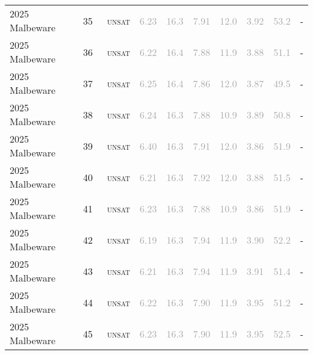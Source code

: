 \begin{center}
{\begin{longtable}{@{}llllllllll@{}}
2025 Malbeware & 35 & ~\textsc{unsat} & \textcolor{darkgray}{6.23} & \textcolor{darkgray}{16.3} & \textcolor{darkgray}{7.91} & \textcolor{darkgray}{12.0} & \textcolor{darkgray}{3.92} & \textcolor{darkgray}{53.2} & - \\
2025 Malbeware & 36 & ~\textsc{unsat} & \textcolor{darkgray}{6.22} & \textcolor{darkgray}{16.4} & \textcolor{darkgray}{7.88} & \textcolor{darkgray}{11.9} & \textcolor{darkgray}{3.88} & \textcolor{darkgray}{51.1} & - \\
2025 Malbeware & 37 & ~\textsc{unsat} & \textcolor{darkgray}{6.25} & \textcolor{darkgray}{16.4} & \textcolor{darkgray}{7.86} & \textcolor{darkgray}{12.0} & \textcolor{darkgray}{3.87} & \textcolor{darkgray}{49.5} & - \\
2025 Malbeware & 38 & ~\textsc{unsat} & \textcolor{darkgray}{6.24} & \textcolor{darkgray}{16.3} & \textcolor{darkgray}{7.88} & \textcolor{darkgray}{10.9} & \textcolor{darkgray}{3.89} & \textcolor{darkgray}{50.8} & - \\
2025 Malbeware & 39 & ~\textsc{unsat} & \textcolor{darkgray}{6.40} & \textcolor{darkgray}{16.3} & \textcolor{darkgray}{7.91} & \textcolor{darkgray}{12.0} & \textcolor{darkgray}{3.86} & \textcolor{darkgray}{51.9} & - \\
2025 Malbeware & 40 & ~\textsc{unsat} & \textcolor{darkgray}{6.21} & \textcolor{darkgray}{16.3} & \textcolor{darkgray}{7.92} & \textcolor{darkgray}{12.0} & \textcolor{darkgray}{3.88} & \textcolor{darkgray}{51.5} & - \\
2025 Malbeware & 41 & ~\textsc{unsat} & \textcolor{darkgray}{6.23} & \textcolor{darkgray}{16.3} & \textcolor{darkgray}{7.88} & \textcolor{darkgray}{10.9} & \textcolor{darkgray}{3.86} & \textcolor{darkgray}{51.9} & - \\
2025 Malbeware & 42 & ~\textsc{unsat} & \textcolor{darkgray}{6.19} & \textcolor{darkgray}{16.3} & \textcolor{darkgray}{7.94} & \textcolor{darkgray}{11.9} & \textcolor{darkgray}{3.90} & \textcolor{darkgray}{52.2} & - \\
2025 Malbeware & 43 & ~\textsc{unsat} & \textcolor{darkgray}{6.21} & \textcolor{darkgray}{16.3} & \textcolor{darkgray}{7.94} & \textcolor{darkgray}{11.9} & \textcolor{darkgray}{3.91} & \textcolor{darkgray}{51.4} & - \\
2025 Malbeware & 44 & ~\textsc{unsat} & \textcolor{darkgray}{6.22} & \textcolor{darkgray}{16.3} & \textcolor{darkgray}{7.90} & \textcolor{darkgray}{11.9} & \textcolor{darkgray}{3.95} & \textcolor{darkgray}{51.2} & - \\
2025 Malbeware & 45 & ~\textsc{unsat} & \textcolor{darkgray}{6.23} & \textcolor{darkgray}{16.3} & \textcolor{darkgray}{7.90} & \textcolor{darkgray}{11.9} & \textcolor{darkgray}{3.95} & \textcolor{darkgray}{52.5} & - \\

\end{longtable}}
\end{center}

